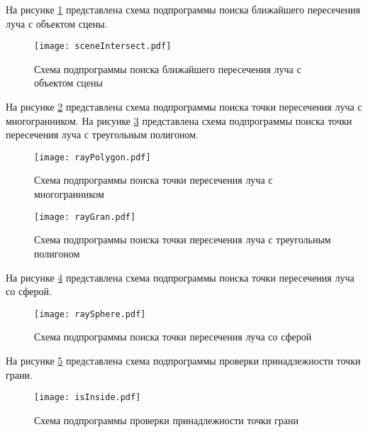 \newpage

На рисунке \ref{img:sceneIntersect} представлена схема подпрограммы поиска ближайшего пересечения луча с объектом сцены.

\begin{figure}[h!]
    \centering
    \texttt{[image: sceneIntersect.pdf]}
    \caption{Схема подпрограммы поиска ближайшего пересечения луча с объектом сцены}
    \label{img:sceneIntersect}
\end{figure}

\newpage

На рисунке \ref{img:rayPolygon} представлена схема подпрограммы поиска точки пересечения луча с многогранником. На рисунке \ref{img:rayGran} представлена схема подпрограммы поиска точки пересечения луча с треугольным полигоном.

\begin{figure}[h!]
    \centering
    \texttt{[image: rayPolygon.pdf]}
    \caption{Схема подпрограммы поиска точки пересечения луча с многогранником}
    \label{img:rayPolygon}
\end{figure}

\begin{figure}[h!]
    \centering
    \texttt{[image: rayGran.pdf]}
    \caption{Схема подпрограммы поиска точки пересечения луча с треугольным полигоном}
    \label{img:rayGran}
\end{figure}

\newpage

На рисунке \ref{img:raySphere} представлена схема подпрограммы поиска точки пересечения луча со сферой.

\begin{figure}[h!]
    \centering
    \texttt{[image: raySphere.pdf]}
    \caption{Схема подпрограммы поиска точки пересечения луча со сферой}
    \label{img:raySphere}
\end{figure}

\newpage

На рисунке \ref{img:isInside} представлена схема подпрограммы проверки принадлежности точки грани.

\begin{figure}[h!]
    \centering
    \texttt{[image: isInside.pdf]}
    \caption{Схема подпрограммы проверки принадлежности точки грани}
    \label{img:isInside}
\end{figure}

